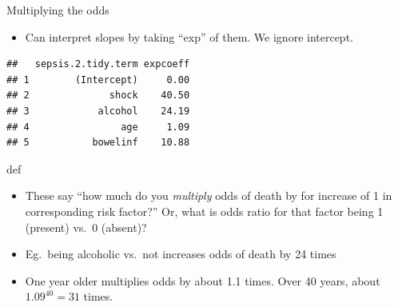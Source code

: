 \documentclass[ignorenonframetext,]{beamer}
\newenvironment{Shaded}{\begin{snugshade}}{\end{snugshade}}
\newcommand{\DataTypeTok}[1]{\textcolor[rgb]{0.13,0.29,0.53}{#1}}
\newcommand{\DecValTok}[1]{\textcolor[rgb]{0.00,0.00,0.81}{#1}}
\newcommand{\FloatTok}[1]{\textcolor[rgb]{0.00,0.00,0.81}{#1}}
\newcommand{\KeywordTok}[1]{\textcolor[rgb]{0.13,0.29,0.53}{\textbf{#1}}}
\newcommand{\NormalTok}[1]{#1}
\newcommand{\OperatorTok}[1]{\textcolor[rgb]{0.81,0.36,0.00}{\textbf{#1}}}
\newcommand{\StringTok}[1]{\textcolor[rgb]{0.31,0.60,0.02}{#1}}
\providecommand{\tightlist}{%
  \setlength{\itemsep}{0pt}\setlength{\parskip}{0pt}}
\begin{document}
\begin{frame}[fragile]{Multiplying the odds}
\protect\hypertarget{multiplying-the-odds}{}

\begin{itemize}
\tightlist
\item
  Can interpret slopes by taking ``exp'' of them. We ignore intercept.
\end{itemize}

\begin{Shaded}
\end{Shaded}

\begin{verbatim}
##   sepsis.2.tidy.term expcoeff
## 1        (Intercept)     0.00
## 2              shock    40.50
## 3            alcohol    24.19
## 4                age     1.09
## 5           bowelinf    10.88
\end{verbatim}

def

\begin{itemize}
\item
  These say ``how much do you \emph{multiply} odds of death by for
  increase of 1 in corresponding risk factor?'' Or, what is odds ratio
  for that factor being 1 (present) vs.~0 (absent)?
\item
  Eg.~being alcoholic vs.~not increases odds of death by 24 times
\item
  One year older multiplies odds by about 1.1 times. Over 40 years,
  about \(1.09^{40}=31\) times.
\end{itemize}

\end{frame}
\end{document}
